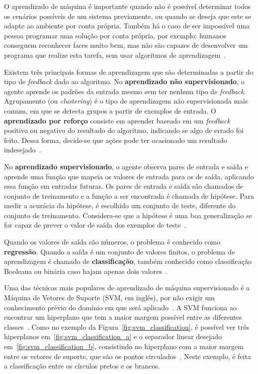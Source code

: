 O aprendizado de máquina é importante quando não é possível determinar todos os cenários possíveis de um sistema previamente, ou quando se deseja que este se adapte ao ambiente por conta própria. Também há o caso de ser impossível uma pessoa programar uma solução por conta própria, por exemplo: humanos conseguem reconhecer faces muito bem, mas não são capazes de desenvolver um programa que realize esta tarefa, sem usar algoritmos de aprendizagem~\cite{russell:2010}.

Existem três principais formas de aprendizagem que são determinadas a partir do tipo de \textit{feedback} dado ao algoritmo. No \textbf{aprendizado não supervisionado}, o agente aprende os padrões da entrada mesmo sem ter nenhum tipo de \textit{feedback}. Agrupamento (ou \textit{clustering}) é o tipo de aprendizagem não supervisionada mais comum, em que se detecta grupos a partir de exemplos de entrada. O \textbf{aprendizado por reforço} consiste em aprender baseado em um \textit{feedback} positivo ou negativo do resultado do algoritmo, indicando se algo de errado foi feito. Dessa forma, decide-se que ações pode ter ocasionado um resultado indesejado~\cite{russell:2010}.

No \textbf{aprendizado supervisionado}, o agente observa pares de entrada e saída e aprende uma função que mapeia os valores de entrada para os de saída, aplicando essa função em entradas futuras. Os pares de entrada e saída são chamados de conjunto de treinamento e a função a ser encontrada é chamada de hipótese. Para medir a acurácia da hipótese, é escolhido um conjunto de teste, diferente do conjunto de treinamento. Considera-se que a hipótese é uma boa generalização se for capaz de prever o valor de saída dos exemplos de teste~\cite{russell:2010}.

Quando os valores de saída são números, o problema é conhecido como \textbf{regressão}. Quando a saída é um conjunto de valores finitos, o problema de aprendizagem é chamado de \textbf{classificação}, também conhecido como classificação Booleana ou binária caso hajam apenas dois valores~\cite{russell:2010}.

Uma das técnicas mais populares de aprendizado de máquina supervisionado é a Máquina de Vetores de Suporte (SVM, em inglês), por não exigir um conhecimento prévio do domínio em que será aplicado~\cite{russell:2010}.
% 
A SVM funciona ao encontrar um hiperplano que tem a maior margem possível entre as diferentes classes~\cite{hearst:1998}. Como no exemplo da Figura~\ref{fig:svm_classification}, é possível ver três hiperplanos em~\ref{fig:svm_classification_a} e o separador linear desejado em~\ref{fig:svm_classification_b}, consistindo no hiperplano com a maior margem entre os vetores de suporte, que são os pontos circulados~\cite{russell:2010}. Neste exemplo, é feita a classificação entre os círculos pretos e os brancos.

